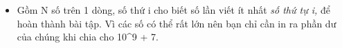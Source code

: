 \begin{itemize}
	\item     Gồm N số trên 1 dòng, số thứ i cho biết số lần viết    \emph{}    ít nhất    \emph{     số thứ tự i,    }    để hoàn thành bài tập. Vì các số có thể rất lớn nên bạn chỉ cần in ra phần dư của chúng khi chia cho 10^9 + 7.   
\end{itemize}